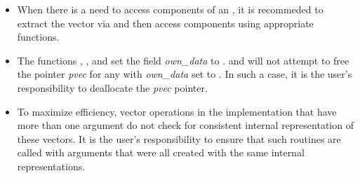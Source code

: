 \begin{itemize}
                                        
\item
  When there is a need to access components of an  , 
  it is recommeded to extract the {\petsc} vector via       
   and then access components using 
  appropriate {\petsc} functions.        
                                                               
\item
  {\warn}The functions , , and
   set the field {\em own\_data} to .   
   and 
  will not attempt to free the pointer {\em pvec} for any  with
  {\em own\_data} set to . In such a case, it is the user's responsibility to
  deallocate the {\em pvec} pointer.

\item
  {\warn}To maximize efficiency, vector operations in the {\nvecpetsc} implementation
  that have more than one  argument do not check for
  consistent internal representation of these vectors. It is the user's 
  responsibility to ensure that such routines are called with 
  arguments that were all created with the same internal representations.

\end{itemize}

